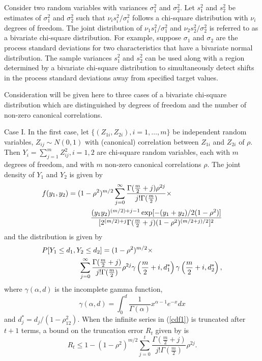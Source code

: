 Consider two random variables with variances $\sigma_1^2$ and $\sigma_2^2$.
Let $s_1^2$ and $s_2^2$ be estimates of $\sigma_1^2$ and $\sigma_2^2$ 
such that $\nu_i s_i^2 / \sigma_i^2$ follows a chi-square distribution 
with $\nu_i$ degrees of freedom.  The joint distribution of $\nu_1 s_1^2 /
\sigma_1^2$ and $\nu_2 s_2^2 / \sigma_2^2$ is referred to as a bivariate
chi-square distribution.
For example, suppose $\sigma_1$ and $\sigma_2$ are the process standard
deviations for two characteristics that have a bivariate normal distribution.
The sample variances $s_1^2$ and $s_2^2$ can be used along with a region
determined by a bivariate chi-square distribution to simultaneously 
detect shifts in the process standard
deviations away from specified target values.


Consideration will be given here to three cases of a bivariate chi-square
distribution which are distinguished by degrees of freedom and the 
number of non-zero canonical correlations.  

Case I.  In the first case, let $\{(Z_{1i}, Z_{2i}), i = 1,\ldots,m\} $ be independent
random variables, $Z_{ij} \sim N(0,1)$ with (canonical) correlation between
$Z_{1i}$ and $ Z_{2i}$ of $\rho$.
Then $Y_i = \sum_{j=1}^m Z_{ij}^2, i=1,2$
are chi-square random variables,
each with $m$ degrees of freedom, and with $m$ non-zero 
canonical correlations $\rho$.
The joint density of $Y_1$ and $Y_2$ is given by 
\begin{eqnarray}
\label{pdf1}
\lefteqn{f(y_1, y_2) = 
  (1-\rho ^2)^{m/2} \sum_{j=0}^\infty \frac{\Gamma (\frac{m}{2}+j)
  \rho^{2j} }{j! \Gamma (\frac{m}{2})} \times} \hspace{3.5in} \nonumber \\
  \frac{ (y_1 y_2)^{(m/2)+j-1} \exp [ -(y_1 + y_2) / 2(1-\rho^2)] }
          { [ 2^{(m/2)+j} \Gamma(\frac{m}{2}+j) (1-\rho^2)^{(m/2+j)/2}]^2 }
\end{eqnarray}
and the distribution is given by 
\begin{eqnarray}
\label{cdf1}
\lefteqn{P[Y_1 \leq d_1, Y_2 \leq d_2] = (1-\rho^2)^{m/2}  \times} 
  \hspace{3.5in} \nonumber \\
  \sum_{j=0}^\infty 
  \frac{\Gamma (\frac{m}{2}+j)}{j! \Gamma (\frac{m}{2})} 
  \rho^{2j} 
  \gamma\left( \frac{m}{2}+i , d_1^*\right)
  \gamma\left( \frac{m}{2}+i , d_2^*\right),
\end{eqnarray}
where $\gamma(\alpha, d) $ is the incomplete gamma function, 
$$
\gamma(\alpha, d) = 
    \int_0^d   \frac{1}{\Gamma(\alpha)} x^{\alpha -1} e^{-x} dx
$$
and $  d_j^* = d_j / (1-\rho^2_{12}) $.
When the infinite series in (\ref{cdf1}) is truncated after $t+1$ terms, 
a bound on the truncation error $R_t$ given by 
\cite{Krish} is
\begin{equation}
\label{error1}
R_t \leq 1- (1-\rho^2)^{m/2}
  \sum_{j=0}^t \frac{\Gamma (\frac{m}{2}+j)}{ j! \Gamma (\frac{m}{2}) }
  \rho^{2j}.
\end{equation}

